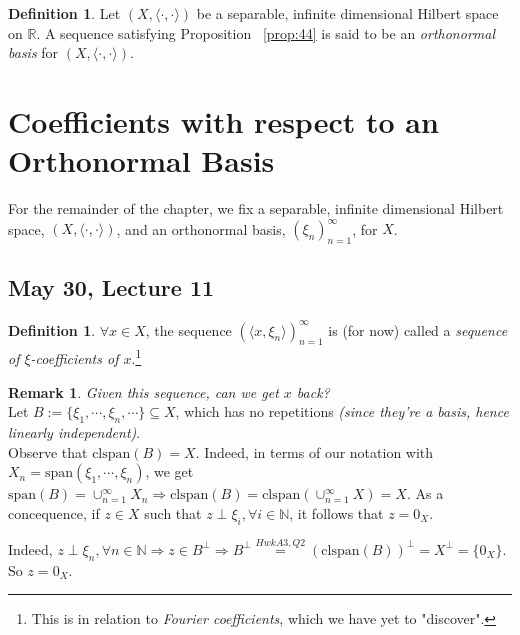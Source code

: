 \documentclass[11pt]{amsart}
\theoremstyle{definition}
\newtheorem{definition}[theorem]{Definition}
\newtheorem{remark}[theorem]{Remark}
\numberwithin{equation}{section}
\newcommand{\bN}{ \mathbb{N} }	%
\newcommand{\bR}{ \mathbb{R} }	%
\newcommand{\ips}{ \left( X, \langle \cdot, \cdot \rangle \right) }		%
\newcommand{ \sspan }{ \mbox{span} }						%
\newcommand{ \clspan }{ \mbox{clspan} }						%
\newcommand{ \onseq }{(\xi_n)^\infty_{n=1}} 					%
\begin{document}
\begin{definition}\label{def:46}
Let $\ips$ be a separable, infinite dimensional Hilbert space on $\bR$. A sequence satisfying Proposition ~\ref{prop:44} is said to be an \textit{orthonormal basis} for $\ips$.
\end{definition}

\vspace{10pt}

\section{Coefficients with respect to an Orthonormal Basis}

\noindent For the remainder of the chapter, we fix a separable, infinite dimensional Hilbert space, $\ips$, and an orthonormal basis, $\onseq$, for $X$. 

\subsection{May 30, Lecture 11}

\begin{definition}\label{def:51}
$\forall x \in X$, the sequence $\left( \langle x, \xi_n \rangle \right)^\infty_{n=1}$ is (for now) called a \textit{sequence of $\xi$-coefficients of $x$}.\footnote{This is in relation to \textit{Fourier coefficients}, which we have yet to "discover".}
\end{definition}

\vspace{6pt}

\begin{remark}\label{rem:52} \textit{Given this sequence, can we get $x$ back?} \\Let $B:= \{\xi_1, \cdots, \xi_n, \cdots\} \subseteq X$, which has no repetitions \textit{(since they're a basis, hence linearly independent)}. \\

Observe that $\clspan(B) = X$. Indeed, in terms of our notation with $X_n = \sspan(\xi_1, \cdots, \xi_n)$, we get $\sspan(B) = \cup_{n=1}^\infty X_n \Rightarrow  \clspan(B) = \clspan(\cup_{n=1}^\infty X) = X$. 
As a concequence, if $z \in X$ such that $z \perp \xi_i, \forall i \in \bN$, it follows that $z = 0_X$. 

\noindent Indeed, $z \perp \xi_n, \forall n \in \bN \Rightarrow z \in B^\perp \Rightarrow B^\perp \overset{ Hwk A3, Q2} = (\clspan(B))^\perp = X^\perp = \{ 0_X \}$. So $z = 0_X$.%
\end{remark}
\end{document}

